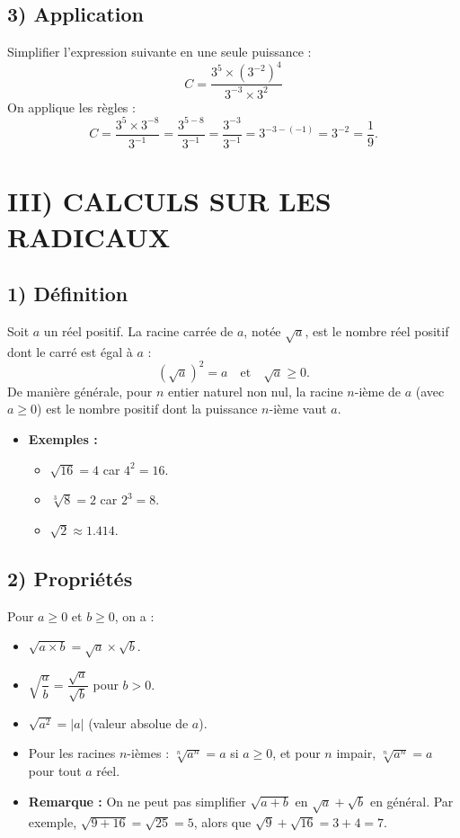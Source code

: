 \documentclass[12pt,a4paper]{article}
\newcounter{exemple}
\begin{document}
\subsection*{\color{myred} 3) Application}
Simplifier l'expression suivante en une seule puissance :
\[
C = \frac{3^5 \times (3^{-2})^4}{3^{-3} \times 3^2}
\]
On applique les règles :
\[
C = \frac{3^{5} \times 3^{-8}}{3^{-1}} = \frac{3^{5-8}}{3^{-1}} = \frac{3^{-3}}{3^{-1}} = 3^{-3 - (-1)} = 3^{-2} = \frac{1}{9}.
\]


\section*{\color{myred} III) CALCULS SUR LES RADICAUX}

\subsection*{\color{myred} 1) Définition}
Soit $a$ un réel positif. La racine carrée de $a$, notée $\sqrt{a}$, est le nombre réel positif dont le carré est égal à $a$ :
\[
(\sqrt{a})^2 = a \quad \text{et} \quad \sqrt{a} \geq 0.
\]
De manière générale, pour $n$ entier naturel non nul, la racine $n$-ième de $a$ (avec $a \geq 0$) est le nombre positif dont la puissance $n$-ième vaut $a$.

\begin{itemize}
    \item \textbf{Exemples :}
    \begin{itemize}
        \item $\sqrt{16} = 4$ car $4^2 = 16$.
        \item $\sqrt[3]{8} = 2$ car $2^3 = 8$.
        \item $\sqrt{2} \approx 1.414$.
    \end{itemize}
\end{itemize}

\subsection*{\color{myred} 2) Propriétés}
Pour $a \geq 0$ et $b \geq 0$, on a :
\begin{itemize}
    \item $\sqrt{a \times b} = \sqrt{a} \times \sqrt{b}$.
    \item $\sqrt{\dfrac{a}{b}} = \dfrac{\sqrt{a}}{\sqrt{b}}$ pour $b > 0$.
    \item $\sqrt{a^2} = |a|$ (valeur absolue de $a$).
    \item Pour les racines $n$-ièmes : $\sqrt[n]{a^n} = a$ si $a \geq 0$, et pour $n$ impair, $\sqrt[n]{a^n} = a$ pour tout $a$ réel.
\end{itemize}
\begin{itemize}
    \item \textbf{Remarque :} On ne peut pas simplifier $\sqrt{a+b}$ en $\sqrt{a} + \sqrt{b}$ en général. Par exemple, $\sqrt{9+16} = \sqrt{25} = 5$, alors que $\sqrt{9} + \sqrt{16} = 3+4 = 7$.
\end{itemize}
\end{document}
